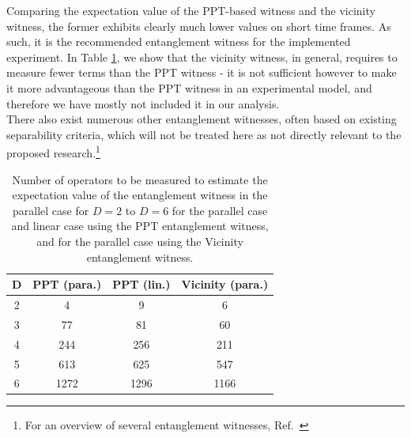 \documentclass[%
 reprint,
 superscriptaddress,
 amsmath,
 amssymb,
 aps,
 longbibliography
]{revtex4-2}
\begin{document}
\begin{appendices}
\indent Comparing the expectation value of the PPT-based witness and the vicinity witness, the former exhibits clearly much lower values on short time frames. As such, it is the recommended entanglement witness for the implemented experiment. In Table \ref{tab:table_2}, we show that the vicinity witness, in general, requires to measure fewer terms than the PPT witness - it is not sufficient however to make it more advantageous than the PPT witness in an experimental model, and therefore we have mostly not included it in our analysis. \\
\indent There also exist numerous other entanglement witnesses, often based on existing separability criteria, which will not be treated here as not directly relevant to the proposed research.\footnote{For an overview of several entanglement witnesses, Ref.~\cite{Guhne2009}}

\begin{table}
\begin{ruledtabular}
\begin{tabular}{ cccc }
  D & PPT (para.) & PPT (lin.) & Vicinity (para.) \\
  \hline
  2 & 4 & 9 & 6  \\
  3 & 77 & 81 & 60 \\
  4 & 244 & 256 & 211\\  
  5 & 613 & 625 & 547\\
  6 & 1272 & 1296 & 1166\\  
\end{tabular}
\end{ruledtabular}
\caption{Number of operators to be measured to estimate the expectation value of the entanglement witness in the parallel case for $D=2$ to $D=6$ for the parallel case and linear case using the PPT entanglement witness, and for the parallel case using the Vicinity entanglement witness.} \label{tab:table_2}

\end{table}


\end{appendices}
\end{document}
